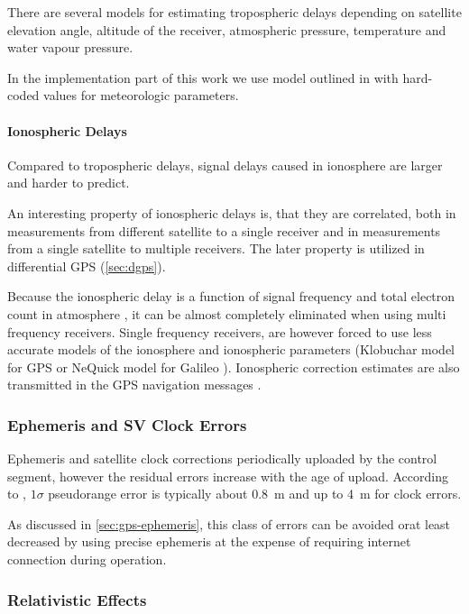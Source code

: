 There are several models for estimating tropospheric delays depending on satellite
elevation angle, altitude of the receiver, atmospheric pressure, temperature and
water vapour pressure.

In the implementation part of this work we use model outlined in \cite{navipedia-tropospheric}
with hard-coded values for meteorologic parameters.

\paragraph{Ionospheric Delays}

Compared to tropospheric delays, signal delays caused in ionosphere are larger and
harder to predict.

An interesting property of ionospheric delays is, that they are correlated,
both in measurements from different satellite to a single receiver and in measurements
from a single satellite to multiple receivers.
The later property is utilized in differential GPS (\cref{sec:dgps}).

Because the ionospheric delay is a function of signal frequency and total electron
count in atmosphere \cite{kaplan06}, it can be almost completely
eliminated when using multi frequency receivers.
Single frequency receivers, are however forced to use less accurate
models of the ionosphere and ionospheric parameters (Klobuchar model for GPS
\cite{navipedia-klobuchar} or NeQuick model for Galileo \cite{navipedia-nequick}).
Ionospheric correction estimates are also transmitted in the GPS navigation
messages \cite{fyfe92}.

\subsubsection{Ephemeris and SV Clock Errors}

Ephemeris and satellite clock corrections periodically uploaded by the control
segment, however the residual errors increase with the age of upload.
According to \cite{kaplan06}, \(1 \sigma\) pseudorange error is typically about \SI{0.8}{\meter}
and up to \SI{4}{\meter} for clock errors.

As discussed in \cref{sec:gps-ephemeris}, this class of errors can be avoided orat least decreased by using precise ephemeris
at the expense of requiring internet connection during operation.

\subsubsection{Relativistic Effects}

